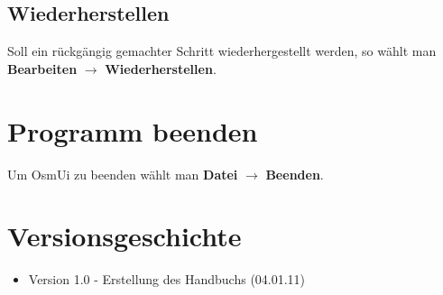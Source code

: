 \documentclass[a4paper,10pt]{scrartcl}
\begin{document}
\subsection{Wiederherstellen}
Soll ein rückgängig gemachter Schritt wiederhergestellt werden, so wählt man \textbf{Bearbeiten} $\rightarrow$ \textbf{Wiederherstellen}.

\section{Programm beenden}
Um OsmUi zu beenden wählt man \textbf{Datei} $\rightarrow$ \textbf{Beenden}.

\section{Versionsgeschichte}
\begin{itemize}
\item Version 1.0 - Erstellung des Handbuchs (04.01.11)
\end{itemize}
\end{document}

